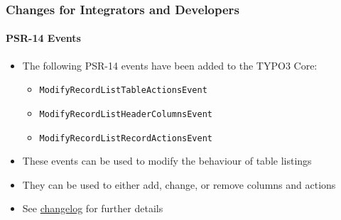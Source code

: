 %

\begin{frame}[fragile]
	\frametitle{Changes for Integrators and Developers}
	\framesubtitle{PSR-14 Events}


	\begin{itemize}
		\item The following PSR-14 events have been added to the TYPO3 Core:
			\begin{itemize}
				\item \texttt{ModifyRecordListTableActionsEvent}
				\item \texttt{ModifyRecordListHeaderColumnsEvent}
				\item \texttt{ModifyRecordListRecordActionsEvent}
			\end{itemize}
		\item These events can be used to modify the behaviour of table listings
		\item They can be used to either add, change, or remove columns and actions
		\item See
			\href{https://docs.typo3.org/c/typo3/cms-core/master/en-us/Changelog/11.4/Feature-95105-NewPSR-14DatabaseRecordListEvents.html}{changelog}
			for further details

	\end{itemize}
\end{frame}

